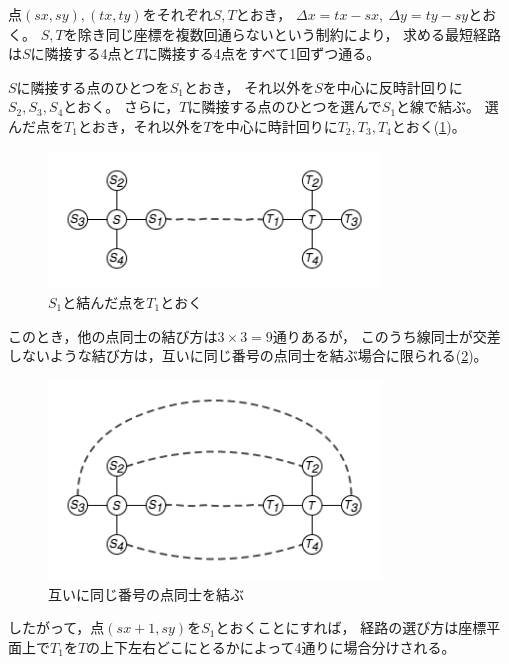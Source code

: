 \documentclass{article}
\begin{document}
点$(sx, sy), (tx, ty)$をそれぞれ$S, T$とおき，
$\Delta x = tx - sx,\ \Delta y = ty - sy$とおく。
$S, T$を除き同じ座標を複数回通らないという制約により，
求める最短経路は$S$に隣接する4点と$T$に隣接する4点をすべて1回ずつ通る。

$S$に隣接する点のひとつを$S_1$とおき，
それ以外を$S$を中心に反時計回りに$S_2, S_3, S_4$とおく。
さらに，$T$に隣接する点のひとつを選んで$S_1$と線で結ぶ。
選んだ点を$T_1$とおき，それ以外を$T$を中心に時計回りに$T_2, T_3, T_4$とおく(\cref{g1})。

\begin{figure}[h]
    \begin{center}
        \includegraphics[width=250pt]{fig1.png}
        \caption{$S_1$と結んだ点を$T_1$とおく}
        \label{g1}
    \end{center}
\end{figure}

このとき，他の点同士の結び方は$3 \times 3 = 9$通りあるが，
このうち線同士が交差しないような結び方は，互いに同じ番号の点同士を結ぶ場合に限られる(\cref{g2})。

\begin{figure}[h]
    \begin{center}
        \includegraphics[width=250pt]{fig2.png}
        \caption{互いに同じ番号の点同士を結ぶ}
        \label{g2}
    \end{center}
\end{figure}

したがって，点$(sx + 1, sy)$を$S_1$とおくことにすれば，
経路の選び方は座標平面上で$T_1$を$T$の上下左右どこにとるかによって4通りに場合分けされる。
\end{document}
